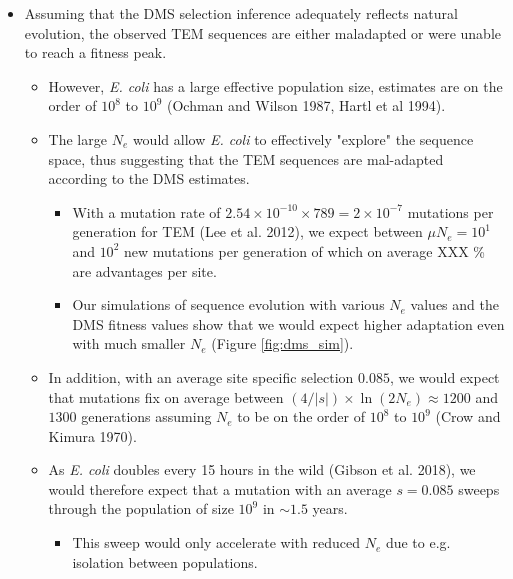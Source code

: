 \documentclass[12pt]{article}
\begin{document}
\begin{itemize}
	\item Assuming that the DMS selection inference adequately reflects natural evolution, the observed TEM sequences are either maladapted or were unable to reach a fitness peak.
	\begin{itemize}
		\item However, \textit{E. coli} has a large effective population size, estimates are on the order of $10^8$ to $10^9$ (Ochman and Wilson 1987, Hartl et al 1994).
		\item The large $N_e$ would allow \textit{E. coli} to effectively "explore" the sequence space, thus suggesting that the TEM sequences are mal-adapted according to the DMS estimates.
		\begin{itemize}
			\item With a mutation rate of $2.54\times 10^{-10} \times 789 = 2\times 10^{-7}$ mutations per generation for TEM (Lee et al. 2012), we expect between $\mu N_e = 10^1$ and $10^2$ new mutations per generation of which on average XXX \% are advantages per site.
			\item Our simulations of sequence evolution with various $N_e$ values and the DMS fitness values show that we would expect higher adaptation even with much smaller $N_e$ (Figure \ref{fig:dms_sim}).
		\end{itemize}
		\item In addition, with an average site specific selection $0.085$, we would expect that mutations fix on average between $(4/|s|)\times \ln(2N_e) \approx 1200$ and $1300$ generations assuming $N_e$ to be on the order of $10^8$ to $10^9$ (Crow and Kimura 1970).
		\item As \textit{E. coli} doubles every 15 hours in the wild (Gibson et al. 2018), we would therefore expect that a mutation with an average $s = 0.085$ sweeps through the population of size $10^9$ in $\sim 1.5$ years.
		\begin{itemize}
			\item This sweep would only accelerate with reduced $N_e$ due to e.g. isolation between populations.
		\end{itemize}
	\end{itemize}
	

\end{itemize}
\end{document}
